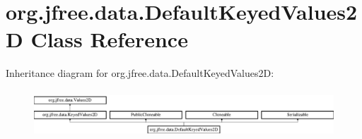 \hypertarget{classorg_1_1jfree_1_1data_1_1_default_keyed_values2_d}{}\section{org.\+jfree.\+data.\+Default\+Keyed\+Values2D Class Reference}
\label{classorg_1_1jfree_1_1data_1_1_default_keyed_values2_d}
Inheritance diagram for org.\+jfree.\+data.\+Default\+Keyed\+Values2D\+:\begin{figure}[H]
\begin{center}
\leavevmode
\includegraphics[height=1.810345cm]{classorg_1_1jfree_1_1data_1_1_default_keyed_values2_d}
\end{center}
\end{figure}
